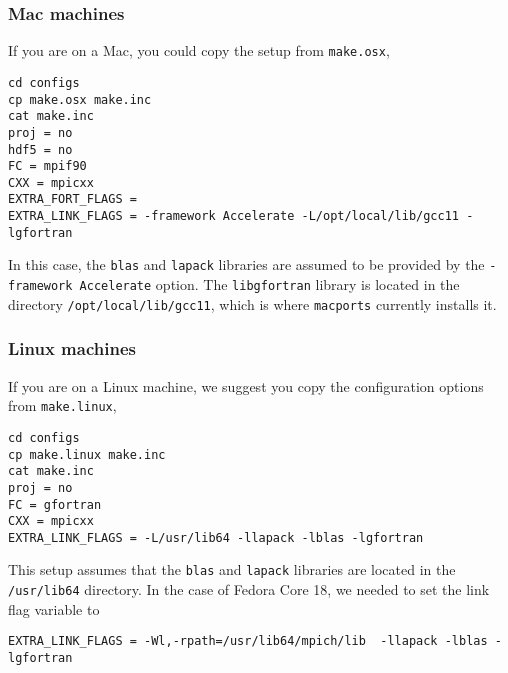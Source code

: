 \documentclass[11pt]{article}
\begin{document}
\subsubsection{Mac machines}
If you are on a Mac, you could copy the setup from \verb+make.osx+,
\begin{verbatim}
cd configs
cp make.osx make.inc
cat make.inc
proj = no
hdf5 = no
FC = mpif90
CXX = mpicxx
EXTRA_FORT_FLAGS = 
EXTRA_LINK_FLAGS = -framework Accelerate -L/opt/local/lib/gcc11 -lgfortran
\end{verbatim}
In this case, the \verb+blas+ and \verb+lapack+ libraries are assumed to be provided by the \verb+-framework Accelerate+ option. The \verb+libgfortran+ library is located in the directory \verb+/opt/local/lib/gcc11+, which is where \verb+macports+ currently installs it.

\subsubsection{Linux machines}
If you are on a Linux machine, we suggest you copy the configuration options from \verb+make.linux+,
\begin{verbatim}
cd configs
cp make.linux make.inc
cat make.inc
proj = no
FC = gfortran
CXX = mpicxx
EXTRA_LINK_FLAGS = -L/usr/lib64 -llapack -lblas -lgfortran
\end{verbatim}
This setup assumes that the \verb+blas+ and \verb+lapack+ libraries are located in the
\verb+/usr/lib64+ directory. 
In the case of Fedora Core 18, we needed to set the link flag variable to
\begin{verbatim}
EXTRA_LINK_FLAGS = -Wl,-rpath=/usr/lib64/mpich/lib  -llapack -lblas -lgfortran
\end{verbatim}
\end{document}
